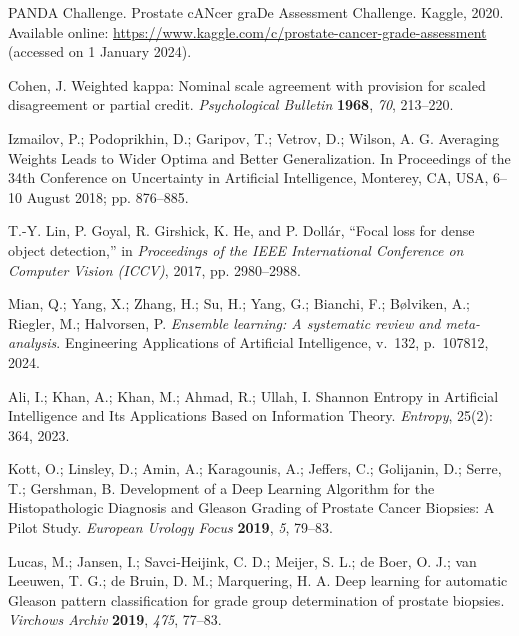 PANDA Challenge. Prostate cANcer graDe Assessment Challenge. Kaggle, 2020. Available online: \url{https://www.kaggle.com/c/prostate-cancer-grade-assessment} (accessed on 1 January 2024).

Cohen, J. Weighted kappa: Nominal scale agreement with provision for scaled disagreement or partial credit. \textit{Psychological Bulletin} \textbf{1968}, \textit{70}, 213--220.

Izmailov, P.; Podoprikhin, D.; Garipov, T.; Vetrov, D.; Wilson, A. G. Averaging Weights Leads to Wider Optima and Better Generalization. In Proceedings of the 34th Conference on Uncertainty in Artificial Intelligence, Monterey, CA, USA, 6--10 August 2018; pp. 876--885.

T.-Y. Lin, P. Goyal, R. Girshick, K. He, and P. Doll\'ar, ``Focal loss for dense object detection,'' in \textit{Proceedings of the IEEE International Conference on Computer Vision (ICCV)}, 2017, pp. 2980--2988.


Mian, Q.; Yang, X.; Zhang, H.; Su, H.; Yang, G.; Bianchi, F.; B{\o}lviken, A.; Riegler, M.; Halvorsen, P.
\textit{Ensemble learning: A systematic review and meta-analysis}.
Engineering Applications of Artificial Intelligence, v.~132, p.~107812, 2024.

Ali, I.; Khan, A.; Khan, M.; Ahmad, R.; Ullah, I.
Shannon Entropy in Artificial Intelligence and Its Applications Based on Information Theory.
\textit{Entropy}, 25(2): 364, 2023.

Kott, O.; Linsley, D.; Amin, A.; Karagounis, A.; Jeffers, C.; Golijanin, D.; Serre, T.; Gershman, B. Development of a Deep Learning Algorithm for the Histopathologic Diagnosis and Gleason Grading of Prostate Cancer Biopsies: A Pilot Study. \textit{European Urology Focus} \textbf{2019}, \textit{5}, 79--83.

Lucas, M.; Jansen, I.; Savci-Heijink, C. D.; Meijer, S. L.; de Boer, O. J.; van Leeuwen, T. G.; de Bruin, D. M.; Marquering, H. A. Deep learning for automatic Gleason pattern classification for grade group determination of prostate biopsies. \textit{Virchows Archiv} \textbf{2019}, \textit{475}, 77--83.

